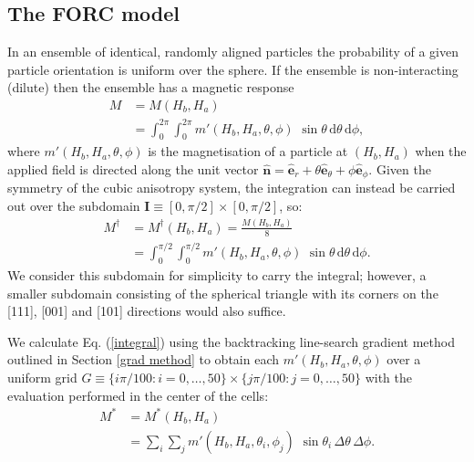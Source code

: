 \subsection{The FORC model}
In an ensemble of identical, randomly aligned particles the probability of a given particle orientation is uniform over the sphere. If the ensemble is non-interacting (dilute) then the ensemble has a magnetic response
\begin{align}
M &= M(H_b, H_a) \nonumber \\
  &= {\int^{2\pi}_{0}}{\int^{2\pi}_{0}} m'(H_b, H_a, \theta, \phi)\,\,\sin\theta\,\text{d}\theta\,\text{d}\phi,
\end{align}
where $m'(H_b, H_a, \theta, \phi)$ is the magnetisation of a particle at $(H_b, H_a)$ when the applied field is directed along the unit vector $\boldsymbol{\hat{n}} = \boldsymbol{\hat{e}}_r + \theta\boldsymbol{\hat{e}}_\theta + \phi\boldsymbol{\hat{e}}_\phi$. Given the symmetry of the cubic anisotropy system, the integration can instead be carried out over the subdomain $\mathbf{I} \equiv [0, \pi/2] \times [0, \pi/2]$, so:
\begin{align}\label{integral}
M^{\dagger} &= M^{\dagger}(H_b, H_a) = \frac{M(H_b, H_a)}{8} \nonumber \\
            &= {\int^{\pi/2}_{0}}{\int^{\pi/2}_{0}} m'(H_b, H_a, \theta, \phi)\,\,\sin\theta\,\text{d}\theta\,\text{d}\phi.
\end{align}
We consider this subdomain for simplicity to carry the integral; however, a smaller subdomain consisting of the spherical triangle with its corners on the [111], [001] and [101] directions would also suffice.\par

We calculate Eq. (\ref{integral}) using the backtracking line-search gradient method outlined in Section \ref{grad method} to obtain each $m'(H_b, H_a, \theta, \phi)$ over a uniform grid $G \equiv \{i\pi/100: i=0,\ldots,50 \} \times \{j\pi/100: j=0,\ldots,50 \}$ with the evaluation performed in the center of the cells:
\begin{align}
M^{*} &= M^{*}(H_b, H_a) \nonumber \\
      &= {\sum_{i}}{\sum_{j}} m'(H_b, H_a, \theta_i, \phi_j)\,\,\sin\theta_i\,\Delta\theta\,\Delta\phi.
\end{align}
\par


